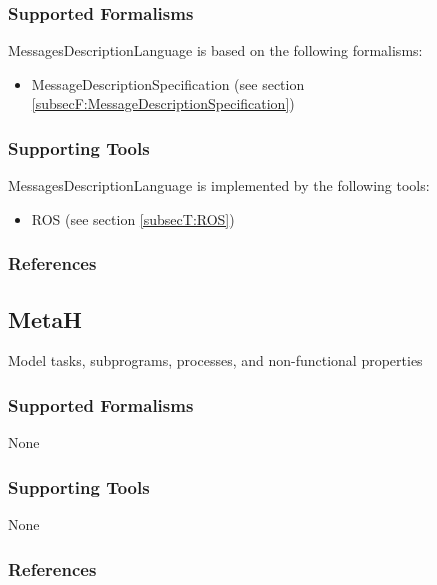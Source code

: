 \subsubsection{Supported Formalisms}

MessagesDescriptionLanguage is based on the following formalisms:
\begin{itemize}
	\item MessageDescriptionSpecification (see section \ref{subsecF:MessageDescriptionSpecification})
\end{itemize}


\subsubsection{Supporting Tools}

MessagesDescriptionLanguage is implemented by the following tools:
\begin{itemize}
	\item ROS (see section \ref{subsecT:ROS})
\end{itemize}


\subsubsection{References}





\subsection{MetaH}
\label{subsecL:MetaH}


Model tasks, subprograms, processes, and non-functional properties

\subsubsection{Supported Formalisms}

None


\subsubsection{Supporting Tools}

None


\subsubsection{References}





